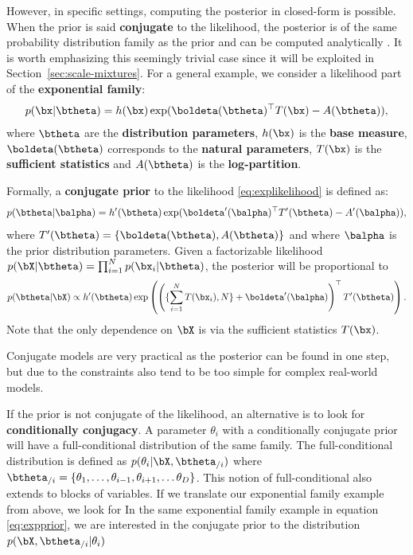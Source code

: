 However, in specific settings, computing the posterior in closed-form is possible.
When the prior is said \textbf{conjugate} to the likelihood, the posterior is of the same probability distribution family as the prior and can be computed analytically \cite{schlaifer1961applied}.
It is worth emphasizing this seemingly trivial case since it will be exploited in Section~\ref{sec:scale-mixtures}.
For a general example, we consider a likelihood part of the \textbf{exponential family}:
\begin{align}
    p(\bx|\btheta) = h(\bx)\exp(\boldeta(\btheta)^\top T(\bx) - A(\btheta)),
    \label{eq:explikelihood}
\end{align}
where $\btheta$ are the \textbf{distribution parameters}, $h(\bx)$ is the \textbf{base measure}, $\boldeta(\btheta)$ corresponds to the \textbf{natural parameters}, $T(\bx)$ is the \textbf{sufficient statistics} and $A(\btheta)$ is the \textbf{log-partition}.

Formally, a \textbf{conjugate prior} to the likelihood \eqref{eq:explikelihood} is defined as:
\begin{align}
    p(\btheta|\balpha) = h'(\btheta)\exp(\boldeta'(\balpha)^\top T'(\btheta) - A'(\balpha)),
    \label{eq:expprior}
\end{align}
where $T'(\btheta) = \left\{\boldeta(\btheta), A(\btheta)\right\}$ and where $\balpha$ is the prior distribution parameters.
Given a factorizable likelihood $p(\bX|\btheta) = \prod_{i=1}^N p(\bx_i|\btheta)$, the posterior will be proportional to
\begin{align}
    p(\btheta|\bX) \propto h'(\btheta)\exp\left(\left(\{\sum_{i=1}^N T(\bx_i), N\} + \boldeta'(\balpha)\right)^\top T'(\btheta)\right).\label{eq:posterior}
\end{align}
Note that the only dependence on $\bX$ is via the sufficient statistics $T(\bx)$.

Conjugate models are very practical as the posterior can be found in one step, but due to the constraints also tend to be too simple for complex real-world models.

If the prior is not conjugate of the likelihood, an alternative is to look for \textbf{conditionally conjugacy}.
A parameter $\theta_i$ with a conditionally conjugate prior will have a full-conditional distribution of the same family.
The full-conditional distribution is defined as $p(\theta_i|
\bX, \btheta_{/i})$ where $\btheta_{/i} = \{\theta_1, \ldots, \theta_{i-1},\theta_{i+1},\ldots\theta_D\}$.
This notion of full-conditional also extends to blocks of variables.
If we translate our exponential family example from above, we look for In the same exponential family example in equation \eqref{eq:expprior}, we are interested in the conjugate prior to the distribution $p(\bX, \btheta_{/i} | \theta_i)$

